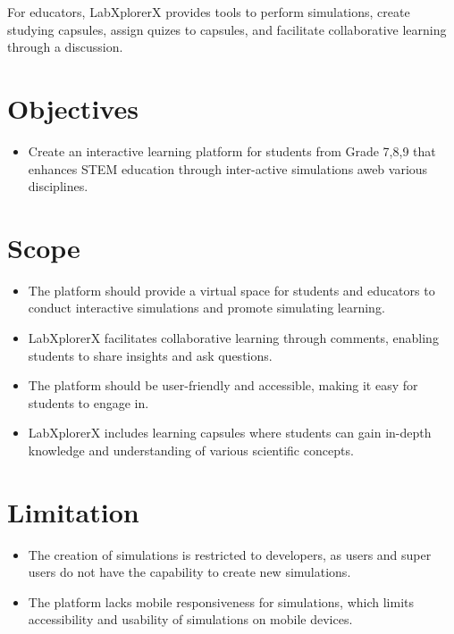 For educators, LabXplorerX provides tools to perform simulations, create studying capsules, assign quizes to capsules, and facilitate collaborative learning through a discussion. 
\section{Objectives}
\begin{itemize}
    \item Create an interactive learning platform for students from Grade 7,8,9 that enhances STEM education through inter-active simulations aweb various disciplines.

\end{itemize}
\section{Scope}

\begin{itemize}
    \item The platform should provide a virtual space for students and educators to conduct interactive simulations and promote simulating learning.
    \item LabXplorerX facilitates collaborative learning through comments, enabling students to share insights and ask questions.
    \item The platform should be user-friendly and accessible, making it easy for students to engage in.
    \item LabXplorerX includes learning capsules where students can gain in-depth knowledge and understanding of various scientific concepts.
\end{itemize}
\section{Limitation}

\begin{itemize} 
    \item The creation of simulations is restricted to developers, as users and super users do not have the capability to create new simulations. 
    \item The platform lacks mobile responsiveness for simulations, which limits accessibility and usability of simulations on mobile devices. 
\end{itemize}

